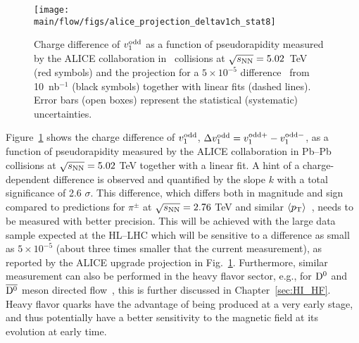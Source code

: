 \begin{figure}[!htb]
\begin{center}
\texttt{[image: \\main/flow/figs/alice\_projection\_deltav1ch\_stat8]}
\caption{
Charge difference of $v_1^{\rm odd}$ as a function of pseudorapidity measured 
  by the ALICE collaboration in \pbpb\ collisions at $\sqrt{s_{\mathrm{NN}}}=5.02$~TeV~\cite{Margutti:2017lup} 
  (red symbols) and the projection for a $5 \times 10^{-5}$ difference~\cite{Gursoy:2014aka} 
  from 10~nb$^{-1}$ (black symbols) together with linear fits (dashed lines). 
Error bars (open boxes) represent the statistical (systematic) uncertainties.}
\label{fig:alice_delta_v1}
\end{center}
\end{figure}


Figure~\ref{fig:alice_delta_v1} shows the charge difference of $v_1^{\rm odd}$, 
$\Delta v_1^{\rm odd}=v_1^{\rm odd +} - v_1^{\rm odd -}$, as a function of pseudorapidity measured by the ALICE collaboration in Pb--Pb collisions 
at $\sqrt{s_{\mathrm{NN}}}=5.02$ TeV \cite{Margutti:2017lup} together with a linear fit. A hint of a charge-dependent difference is observed and quantified 
by the slope $k$ with a total significance of 2.6 $\sigma$. 
This difference, which differs both in magnitude and sign compared to 
  predictions for $\pi^{\pm}$ at $\sqrt{s_{\mathrm{NN}}}=2.76$ TeV and similar 
  $\langle p_{\rm T} \rangle$~\cite{Gursoy:2014aka}, needs to be 
  measured with better precision.
This will be achieved with the large data sample expected at the HL--LHC
  which will be sensitive to a difference as small as $5 \times 10^{-5}$ 
  (about three times smaller that the current measurement), as reported by 
  the ALICE upgrade projection in Fig.~\ref{fig:alice_delta_v1}.
Furthermore, similar measurement can also be performed
in the heavy flavor sector, e.g., for $\rm D^{0}$ and $\rm \overline{D^{0}}$ meson directed flow~\cite{Das:2016cwd}, this is further discussed in Chapter~\ref{sec:HI_HF}. 
Heavy flavor quarks have the advantage of being produced at a very early stage, 
and thus potentially have a better sensitivity to the magnetic field at its evolution at early time.




